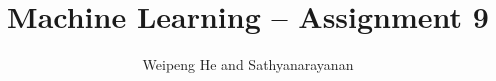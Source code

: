 \documentclass{article}[11pt]
\title{Machine Learning -- Assignment 9}
\author{Weipeng He and Sathyanarayanan}
\begin{document}
\maketitle

\section{}
\end{document}
